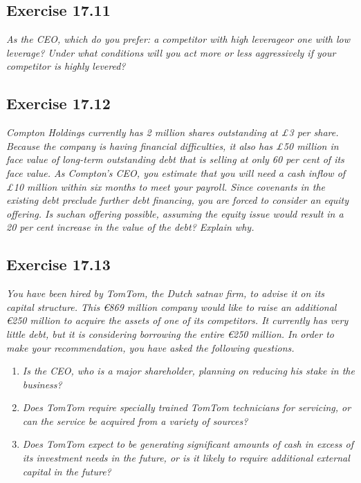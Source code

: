 \documentclass[]{book}
\newcommand{\euro}{€}
\theoremstyle{definition}
\theoremstyle{definition}
\theoremstyle{remark}
\begin{document}
\subsection{Exercise 17.11}\label{exercise-17.11}

\emph{As the CEO, which do you prefer: a competitor with high leverageor
one with low leverage? Under what conditions will you act more or less
aggressively if your competitor is highly levered?} \citep[p.576]{book}

\subsection{Exercise 17.12}\label{exercise-17.12}

\emph{Compton Holdings currently has 2 million shares outstanding at £3
per share. Because the company is having financial difficulties, it also
has £50 million in face value of long-term outstanding debt that is
selling at only 60 per cent of its face value. As Compton's CEO, you
estimate that you will need a cash inflow of £10 million within six
months to meet your payroll. Since covenants in the existing debt
preclude further debt financing, you are forced to consider an equity
offering. Is suchan offering possible, assuming the equity issue would
result in a 20 per cent increase in the value of the debt? Explain why.}
\citep[p.576]{book}

\subsection{Exercise 17.13}\label{exercise-17.13}

\emph{You have been hired by TomTom, the Dutch satnav firm, to advise it
on its capital structure. This \euro{}869 million company would like to
raise an additional \euro{}250 million to acquire the assets of one of
its competitors. It currently has very little debt, but it is
considering borrowing the entire \euro{}250 million. In order to make
your recommendation, you have asked the following questions.}
\citep[p.576]{book}

\begin{enumerate}
\def\labelenumi{\alph{enumi}.}
\item
  \emph{Is the CEO, who is a major shareholder, planning on reducing his
  stake in the business?} \citep[p.576]{book}
\item
  \emph{Does TomTom require specially trained TomTom technicians for
  servicing, or can the service be acquired from a variety of sources?}
  \citep[p.576]{book}
\item
  \emph{Does TomTom expect to be generating significant amounts of cash
  in excess of its investment needs in the future, or is it likely to
  require additional external capital in the future?}
  \citep[p.576]{book}
\end{enumerate}
\end{document}
